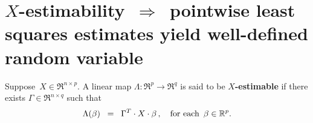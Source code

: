 

\section{$X$-estimability \,$\Longrightarrow$\, pointwise least squares estimates yield well-defined random variable}
\setcounter{theorem}{0}
\setcounter{equation}{0}

\renewcommand{\theenumi}{\roman{enumi}}
\renewcommand{\labelenumi}{\textnormal{(\theenumi)}$\;\;$}


\begin{definition}[$X$-estimability]
\mbox{}\vskip 0.1cm\noindent
Suppose \,$X \in \Re^{n \times p}$.
A linear map $\Lambda : \Re^{p} \longrightarrow \Re^{q}$ is said to be \textbf{$X$-estimable}
if there exists $\Gamma \in \Re^{n \times q}$ such that
\begin{equation*}
\Lambda(\beta) \;\; =\;\; \Gamma^{T} \cdot X \cdot \beta\,,
\quad
\textnormal{for each \,$\beta \in \Re^{p}$}.
\end{equation*}
\end{definition}


